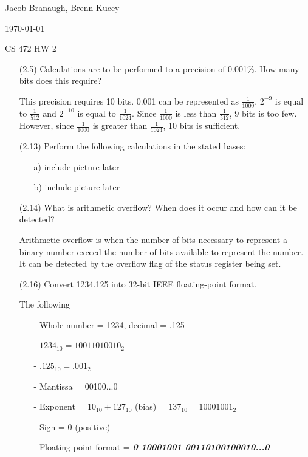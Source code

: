 \documentclass[letterpaper,10pt,titlepage]{article}
\def\name{Jacob Branaugh, Brenn Kucey}
\begin{document}
\hfill \name

\hfill \today

\hfill CS 472 HW 2

\begin{enumerate}
\item[(2.5)] Calculations are to be performed to a precision of 0.001\%. How many bits
	does this require?
  \item[\textbullet] This precision requires 10 bits. 0.001 can be represented as
	$\frac{1}{1000}$. $2^{-9}$ is equal to $\frac{1}{512}$ and $2^{-10}$ is equal to
	$\frac{1}{1024}$. Since $\frac{1}{1000}$ is less than $\frac{1}{512}$, 9 bits is
	too few. However, since $\frac{1}{1000}$ is greater than $\frac{1}{1024}$, 10
	bits is sufficient.

\item[(2.13)] Perform the following calculations in the stated bases:
  \begin{enumerate}
    \item[a)] include picture later
    \item[b)] include picture later
  \end{enumerate}

\item[(2.14)] What is arithmetic overflow? When does it occur and how can it be detected?
  \item[\textbullet] Arithmetic overflow is when the number of bits necessary to represent
	  a binary number exceed the number of bits available to represent the number.
	  It can be detected by the overflow flag of the status register being set.

\item[(2.16)] Convert 1234.125 into 32-bit IEEE floating-point format.
  \item[\textbullet] The following
    \begin{enumerate} 
      \item[-] Whole number = 1234, decimal = .125
      \item[-] $1234_{10} = 10011010010_{2}$
      \item[-] $.125_{10} = .001_{2}$
      \item[-] Mantissa = 00100...0
      \item[-] Exponent = $10_{10} + 127_{10}$ (bias) = $137_{10} = 10001001_{2}$
      \item[-] Sign = 0 (positive)
      \item[-] Floating point format =
	      {\large\textit{\textbf{0 10001001 00110100100010...0}}}
    \end{enumerate}


\end{enumerate}
\end{document}
